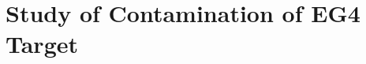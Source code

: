 

\section{Study of  Contamination of EG4  Target}   %

\begin{comment}  %
The first analysis goal for the EG4 \nd3 data set is to extract the difference of polarized cross sections (from the difference of yields) as given by the following expression:

\begin{equation}
  \delta \sigma = \sigma^+ - \sigma^- = \frac{1}{N_t}\cdot \left[ \frac{N^+}{N^+_{e^-}} - \frac{N^-}{N^-_{e^-}} \right]\cdot \frac{1}{\Delta\Omega}\cdot \frac{1}{E_{detector}} %
  \label{eqXSdiff}
\end{equation}

where, 
\begin{itemize}
  \item $N_t$ = Number of deuteron nucleii in the target = $3 N_a l_A \frac{\rho_A}{m_A}$, with 
    \begin{itemize}
      \item 3: number of Deuteron atoms in a \hnd3 molecule
      \item $N_a = 6.02\times 10^{23}$: Avogadro's number
      \item $l_A =$ target length (cm) $\times$ packing fraction
      \item $\rho_A = 1.056 (g/cm^3)$: Target density
      \item $m_A = 21.042414237 (g)$: Mass of target molecule \hnd3   %


\end{comment}
